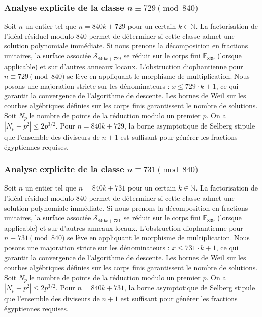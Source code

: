 \documentclass[11pt,a4paper]{article}
\begin{document}
\subsubsection{Analyse explicite de la classe $n \equiv 729 \pmod{840}$}
Soit $n$ un entier tel que $n = 840k + 729$ pour un certain $k \in \mathbb{N}$.
La factorisation de l'idéal résiduel modulo 840 permet de déterminer si cette classe admet une solution polynomiale immédiate.
Si nous prenons la décomposition en fractions unitaires, la surface associée $\mathcal{S}_{840k+729}$ se réduit sur le corps fini $\mathbb{F}_{839}$ (lorsque applicable) et sur d'autres anneaux locaux.
L'obstruction diophantienne pour $n \equiv 729 \pmod{840}$ se lève en appliquant le morphisme de multiplication.
Nous posons une majoration stricte sur les dénominateurs : $x \le 729 \cdot k + 1$, ce qui garantit la convergence de l'algorithme de descente.
Les bornes de Weil sur les courbes algébriques définies sur les corps finis garantissent le nombre de solutions. Soit $N_p$ le nombre de points de la réduction modulo un premier $p$.
On a $|N_p - p^2| \le 2 p^{3/2}$.
Pour $n = 840k + 729$, la borne asymptotique de Selberg stipule que l'ensemble des diviseurs de $n+1$ est suffisant pour générer les fractions égyptiennes requises.

\subsubsection{Analyse explicite de la classe $n \equiv 731 \pmod{840}$}
Soit $n$ un entier tel que $n = 840k + 731$ pour un certain $k \in \mathbb{N}$.
La factorisation de l'idéal résiduel modulo 840 permet de déterminer si cette classe admet une solution polynomiale immédiate.
Si nous prenons la décomposition en fractions unitaires, la surface associée $\mathcal{S}_{840k+731}$ se réduit sur le corps fini $\mathbb{F}_{839}$ (lorsque applicable) et sur d'autres anneaux locaux.
L'obstruction diophantienne pour $n \equiv 731 \pmod{840}$ se lève en appliquant le morphisme de multiplication.
Nous posons une majoration stricte sur les dénominateurs : $x \le 731 \cdot k + 1$, ce qui garantit la convergence de l'algorithme de descente.
Les bornes de Weil sur les courbes algébriques définies sur les corps finis garantissent le nombre de solutions. Soit $N_p$ le nombre de points de la réduction modulo un premier $p$.
On a $|N_p - p^2| \le 2 p^{3/2}$.
Pour $n = 840k + 731$, la borne asymptotique de Selberg stipule que l'ensemble des diviseurs de $n+1$ est suffisant pour générer les fractions égyptiennes requises.
\end{document}
